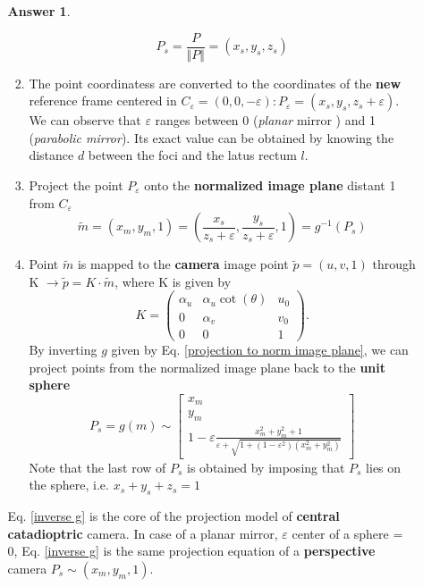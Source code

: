 \documentclass[a4paper,12 pt]{article}
\theoremstyle{definition}
\theoremstyle{remark}
\theoremstyle{definition}
\theoremstyle{definition}
\theoremstyle{definition}
\theoremstyle{definition}
\theoremstyle{remark}
\theoremstyle{remark}
\theoremstyle{definition}
\theoremstyle{definition}
\newtheorem*{answer}{Answer}
\begin{document}
\begin{enumerate}
\begin{enumerate}
\begin{answer}
\begin{enumerate}
\begin{equation}\label{nomalize P to unit sphere}
P_s=\frac{P}{\Vert P \Vert}=(x_s,y_s,z_s)
\end{equation}
\item The point coordinatess are converted to the coordinates of the \textbf{new} reference frame centered in $C_\varepsilon = (0,0,-\varepsilon) : P_\varepsilon =(x_s,y_s,z_s+\varepsilon)$. We can observe that $\varepsilon$ ranges between 0 (\textit{planar} mirror ) and 1 (\textit{parabolic mirror}). Its exact value can be obtained by knowing the distance $d$ between the foci and the latus rectum $l$.
\item Project the point $P_\varepsilon$ onto the \textbf{ normalized image plane} distant 1 from $C_\varepsilon$ 
\begin{equation}\label{projection to norm image plane}
\tilde{m}=(x_m,y_m,1)=\left(\frac{x_s}{z_s+\varepsilon}, \frac{y_s}{z_s+\varepsilon},1\right)= g^{-1} (P_s)
\end{equation}
\item Point $\tilde{m}$ is mapped to the \textbf{camera} image point $\tilde{p}=(u,v,1)$ through K $\rightarrow \tilde{p}= K\cdot \tilde{m}$, where K is given by 
\begin{equation}
K=\begin{pmatrix}
\alpha_u &\alpha_u \cot(\theta)&u_0\\
0&\alpha_v &v_0\\
0&0&1
\end{pmatrix}.
\end{equation}
By inverting $g$ given by Eq. \ref{projection to norm image plane}, we can project points from the normalized image plane back to the  \textbf{unit sphere}
\begin{equation}\label{inverse g}
P_s= g(m) \sim \begin{bmatrix}
x_m\\
y_m\\
1-\varepsilon\frac{x_m^2+y_m^2+1}{\varepsilon+\sqrt{1+(1-\varepsilon^2)(x_m^2+y_m^2)}}
\end{bmatrix}
\end{equation} 
Note that the last row of $P_s$ is obtained by imposing that $P_s$ lies on the sphere, i.e. $x_s+y_s+z_s=1$
\end{enumerate}
Eq.  \ref{inverse g} is the core of the projection model of \textbf{central catadioptric} camera. In case of a planar mirror, $\varepsilon$ center of a sphere = 0, Eq. \ref{inverse g} is the same projection equation of a \textbf{perspective} camera $P_s\sim (x_m,y_m,1)$.

\end{answer}
\end{enumerate}
\end{enumerate}
\end{document}

